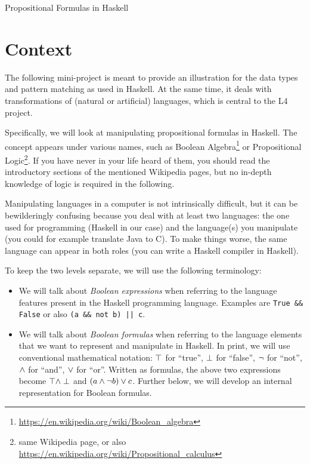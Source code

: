 \documentclass[english]{article}
\begin{document}
\begin{center}
  {\LARGE Propositional Formulas in Haskell}
\end{center}


\section{Context}\label{sec:context}

The following mini-project is meant to provide an illustration for the
data types and pattern matching as used in Haskell. At the same time, it deals with
transformations of (natural or artificial) languages, which is central to the
L4 project.

Specifically, we will look at manipulating propositional formulas in
Haskell. The concept appears under various names, such as Boolean
Algebra\footnote{\url{https://en.wikipedia.org/wiki/Boolean_algebra}} or
Propositional Logic\footnote{same Wikipedia page, or also
  \url{https://en.wikipedia.org/wiki/Propositional_calculus}}. If you have
never in your life heard of them, you should read the introductory sections of
the mentioned Wikipedia pages, but no in-depth knowledge of logic is required
in the following.

Manipulating languages in a computer is not intrinsically difficult, but it
can be bewilderingly confusing because you deal with at least two
languages: the one used for programming (Haskell in our case) and the
language(s) you manipulate (you could for example translate Java to C). To
make things worse, the same language can appear in both roles (you can write a
Haskell compiler in Haskell).

To keep the two levels separate, we will use the following terminology:
\begin{itemize}
\item We will talk about \emph{Boolean expressions} when referring to the
  language features present in the Haskell programming language. Examples are
  \texttt{True \&\& False} or also \texttt{(a \&\& not b) || c}.
\item We will talk about \emph{Boolean formulas} when referring to the
  language elements that we want to represent and manipulate in Haskell. In
  print, we will use conventional mathematical notation: $\top$ for ``true'',
  $\perp$ for ``false'', $\lnot$ for ``not'', $\land$ for ``and'', $\lor$ for
  ``or''. Written as formulas, the above two expressions become $\top \land
  \perp$ and $(a \land \lnot b) \lor c$. Further below, we will develop an
  internal representation for Boolean formulas.
\end{itemize}
\end{document}
